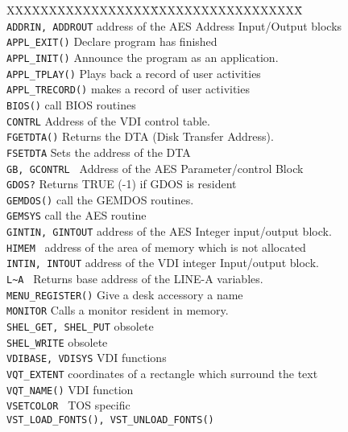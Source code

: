 \begin{tabbing}
XXXXXXXXXXXXXXXXX\=XXXXXXXXXXXXXXXXXX\=\kill\\
\verb|ADDRIN, ADDROUT|\> address of the AES Address Input/Output blocks\\
\verb|APPL_EXIT()|\>	Declare program has finished\\
\verb|APPL_INIT()|\>	Announce the program as an application.\\
\verb|APPL_TPLAY()|\>	Plays back a record of user activities\\
\verb|APPL_TRECORD()|\>	makes a record of user activities\\
\verb|BIOS()|\>		call BIOS routines\\
\verb|CONTRL|\>		Address of the VDI control table.\\
\verb|FGETDTA()|\>	Returns the DTA (Disk Transfer Address).\\
\verb|FSETDTA|\> 	Sets the address of the DTA\\
\verb|GB, GCONTRL |\>    Address of the AES Parameter/control Block\\
\verb|GDOS?|\>		Returns  TRUE  (-1)  if GDOS is  resident\\
\verb|GEMDOS()|\>	call the GEMDOS routines.\\
\verb|GEMSYS|\>		call the AES routine\\
\verb|GINTIN, GINTOUT|\> address of the AES Integer input/output block.\\
\verb|HIMEM |\>         address of the area of memory which is not allocated\\
\verb|INTIN, INTOUT|\>   address of the VDI integer Input/output block.\\
\verb|L~A |\>           	Returns base address of the LINE-A variables.\\
\verb|MENU_REGISTER()|\> Give a desk accessory a name\\
\verb|MONITOR|\>        	Calls a monitor resident in memory.\\
\verb|SHEL_GET, SHEL_PUT|\>  	obsolete\\
\verb|SHEL_WRITE|\>	obsolete\\
\verb|VDIBASE, VDISYS|\> VDI  functions\\
\verb|VQT_EXTENT|\>     	coordinates of a rectangle  which surround the text\\
\verb|VQT_NAME()|\>     	VDI  function\\
\verb|VSETCOLOR |\>     	TOS specific\\
\verb|VST_LOAD_FONTS(), VST_UNLOAD_FONTS()|\\

\end{tabbing}
